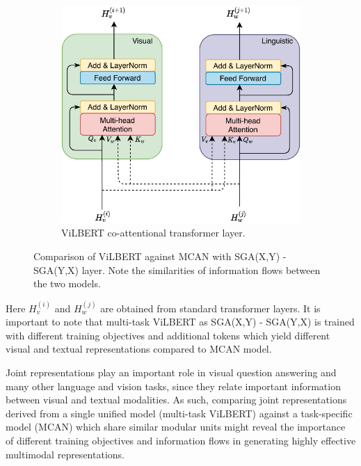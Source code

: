 \documentclass{article}
\begin{document}
\begin{figure}[H]
\begin{subfigure}[b]{\textwidth}
	\includegraphics[scale=0.7]{vilbert_coattention}
	\caption{ViLBERT co-attentional transformer layer.}
	\end{subfigure}
\caption{Comparison of ViLBERT against MCAN with SGA(X,Y) - SGA(Y,X) layer. Note the similarities of information flows between the two models.}
\label{fig:vilbert_coattention}
\end{figure}

Here $H_{v}^{(i)}$ and $H_{w}^{(j)}$ are obtained from standard transformer layers. It is important to note that  multi-task ViLBERT as SGA(X,Y) - SGA(Y,X) is trained with different training objectives and additional tokens which yield different visual and textual representations compared to MCAN model. 

Joint representations play an important role in visual question answering and many other language and vision tasks, since they relate important information between visual and textual modalities. As such, comparing joint representations derived from a single unified model (multi-task ViLBERT) against a task-specific model (MCAN) which share similar modular units might reveal the importance of different training objectives and information flows in generating highly effective multimodal representations.

\end{document}
